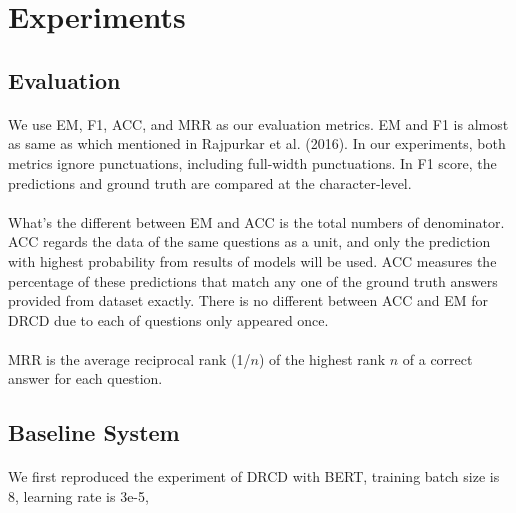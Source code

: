 \documentclass{article}
\begin{document}
\section{Experiments}
\paragraph{}

\subsection{Evaluation}
\paragraph{}
We use EM, F1, ACC, and MRR as our evaluation metrics. EM and F1 is almost as same as which mentioned in Rajpurkar et al. (2016)\cite{rajpurkar2016squad}. In our experiments, both metrics ignore punctuations, including full-width punctuations. In F1 score, the predictions and ground truth are compared at the character-level.

\paragraph{}
What's the different between EM and ACC is the total numbers of denominator. ACC regards the data of the same questions as a unit, and only the prediction with highest probability from results of models will be used. ACC measures the percentage of these predictions that match any one of the ground truth answers provided from dataset exactly. There is no different between ACC and EM for DRCD due to each of questions only appeared once.

\paragraph{}
MRR is the average reciprocal rank (1/$n$) of the highest rank $n$ of a correct answer for each question.

\subsection{Baseline System}
\paragraph{}
We first reproduced the experiment of DRCD with BERT, training batch size is 8, learning rate is 3e-5,
\end{document}
